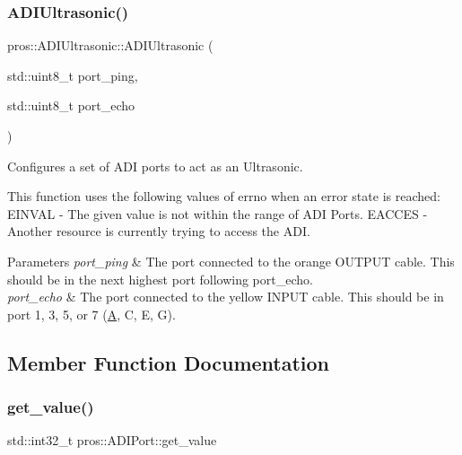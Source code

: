 \subsubsection{\texorpdfstring{ADIUltrasonic()}{ADIUltrasonic()}}
{\footnotesize\ttfamily pros\+::\+A\+D\+I\+Ultrasonic\+::\+A\+D\+I\+Ultrasonic (\begin{DoxyParamCaption}\item[{std\+::uint8\+\_\+t}]{port\+\_\+ping,  }\item[{std\+::uint8\+\_\+t}]{port\+\_\+echo }\end{DoxyParamCaption})}



Configures a set of A\+DI ports to act as an Ultrasonic. 

This function uses the following values of errno when an error state is reached\+: E\+I\+N\+V\+AL -\/ The given value is not within the range of A\+DI Ports. E\+A\+C\+C\+ES -\/ Another resource is currently trying to access the A\+DI.


\begin{DoxyParams}{Parameters}
{\em port\+\_\+ping} & The port connected to the orange O\+U\+T\+P\+UT cable. This should be in the next highest port following port\+\_\+echo. \\
\hline
{\em port\+\_\+echo} & The port connected to the yellow I\+N\+P\+UT cable. This should be in port 1, 3, 5, or 7 (\textquotesingle{}\mbox{\hyperlink{structA}{A}}\textquotesingle{}, \textquotesingle{}C\textquotesingle{}, \textquotesingle{}E\textquotesingle{}, \textquotesingle{}G\textquotesingle{}). \\
\hline
\end{DoxyParams}


\subsection{Member Function Documentation}
\mbox{\label{classpros_1_1ADIUltrasonic_ac79b5fd3ce67ae6ffc4b1fbbb306e997}} 
\subsubsection{\texorpdfstring{get\_value()}{get\_value()}}
{\footnotesize\ttfamily std\+::int32\+\_\+t pros\+::\+A\+D\+I\+Port\+::get\+\_\+value}



